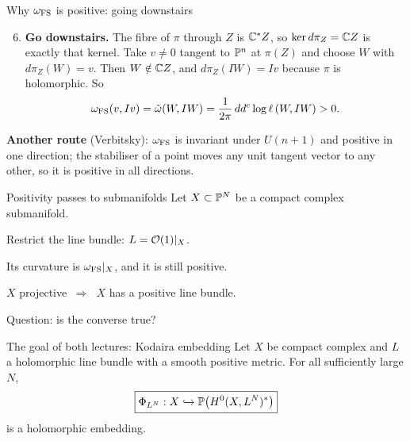 \begin{frame}{Why \(\omega_{\rm FS}\) is positive: going downstairs}
\begin{enumerate}
\setcounter{enumi}{5}
\item \textbf{Go downstairs.} The fibre of \(\pi\) through \(Z\) is \(\mathbb C^*Z\), so \(\ker d\pi_Z=\mathbb C Z\) is exactly that kernel. Take \(v\ne0\) tangent to \(\mathbb P^n\) at \(\pi(Z)\) and choose \(W\) with \(d\pi_Z(W)=v\). Then \(W\notin\mathbb C Z\), and \(d\pi_Z(IW)=Iv\) because \(\pi\) is holomorphic. So
\[
\omega_{\rm FS}(v,Iv)=\tilde\omega(W,IW)=\frac{1}{2\pi}\,dd^c\log\ell\,(W,IW)>0.
\]
\end{enumerate}
\textbf{Another route} (Verbitsky): \(\omega_{\rm FS}\) is invariant under \(U(n+1)\) and positive in one direction; the stabiliser of a point moves any unit tangent vector to any other, so it is positive in all directions.
\end{frame}

\begin{frame}{Positivity passes to submanifolds}
Let \(X\subset\mathbb P^N\) be a compact complex submanifold.
\par\bigskip
Restrict the line bundle: \(L=\mathcal O(1)|_X\).
\par\medskip
Its curvature is \(\omega_{\rm FS}|_X\), and it is still positive.
\par\bigskip
\begin{center}
\Large\(X\) projective \(\ \Longrightarrow\ \) \(X\) has a positive line bundle.
\end{center}
\par\bigskip
Question: is the converse true?
\end{frame}

\begin{frame}{The goal of both lectures: Kodaira embedding}
Let \(X\) be compact complex and \(L\) a holomorphic line bundle with a smooth positive metric.
For all sufficiently large \(N\),
\[
\boxed{\Phi_{L^N}:X\hookrightarrow
\mathbb P\bigl(H^0(X,L^N)^*\bigr)}
\]
is a holomorphic embedding.
\end{frame}

